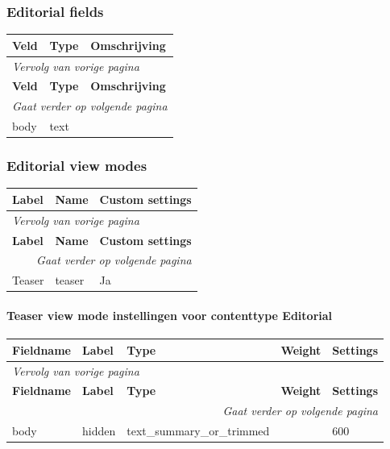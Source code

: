 \subsubsection{Editorial fields}
  \begin{longtable}{| p{5.00cm}|p{5.00cm}|p{5.00cm}|}
  \hline
  \rowcolor{tableheader}
  \textbf{Veld} & \textbf{Type} & \textbf{Omschrijving}  \tabularnewline
  \hline
\endfirsthead
\multicolumn{3}{l}{\textit{Vervolg van vorige pagina}} \\
\hline
\rowcolor{tableheader}
  \textbf{Veld} & \textbf{Type} & \textbf{Omschrijving}  \tabularnewline
  \hline
\hline
\endhead
\multicolumn{3}{r}{\textit{Gaat verder op volgende pagina}} \\
\endfoot
\hline
\endlastfoot
  body & text &   \tabularnewline
  \hline
  \end{longtable}

\subsubsection{Editorial view modes}
  \begin{longtable}{| p{5.00cm}|p{5.00cm}|p{5.00cm}|}
  \hline
  \rowcolor{tableheader}
  \textbf{Label} & \textbf{Name} & \textbf{Custom settings}  \tabularnewline
  \hline
\endfirsthead
\multicolumn{3}{l}{\textit{Vervolg van vorige pagina}} \\
\hline
\rowcolor{tableheader}
  \textbf{Label} & \textbf{Name} & \textbf{Custom settings}  \tabularnewline
  \hline
\hline
\endhead
\multicolumn{3}{r}{\textit{Gaat verder op volgende pagina}} \\
\endfoot
\hline
\endlastfoot
  Teaser & teaser & Ja  \tabularnewline
  \hline
  \end{longtable}

\paragraph{Teaser view mode instellingen voor contenttype Editorial }

  \begin{longtable}{| p{3.00cm}|p{3.00cm}|p{3.00cm}|p{3.00cm}|p{3.00cm}|}
  \hline
  \rowcolor{tableheader}
  \textbf{Fieldname} & \textbf{Label} & \textbf{Type} & \textbf{Weight} & \textbf{Settings}  \tabularnewline
  \hline
\endfirsthead
\multicolumn{5}{l}{\textit{Vervolg van vorige pagina}} \\
\hline
\rowcolor{tableheader}
  \textbf{Fieldname} & \textbf{Label} & \textbf{Type} & \textbf{Weight} & \textbf{Settings}  \tabularnewline
  \hline
\hline
\endhead
\multicolumn{5}{r}{\textit{Gaat verder op volgende pagina}} \\
\endfoot
\hline
\endlastfoot
  body & hidden & text\_summary\_or\_trimmed &   & 600  \tabularnewline
  \hline
  \end{longtable}

